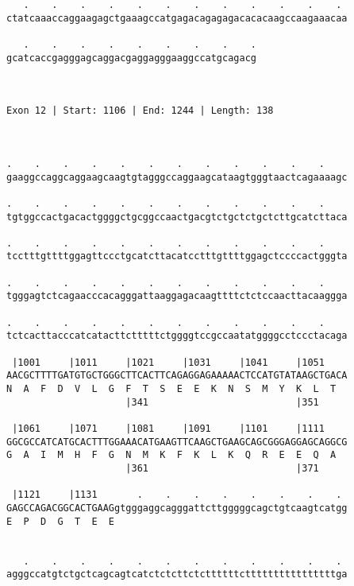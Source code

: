 \documentclass{article}
\begin{document}
\begin{Verbatim}
   .    .    .    .    .    .    .    .    .    .    .    . 
ctatcaaaccaggaagagctgaaagccatgagacagagagacacacaagccaagaaacaa
                                                            
   .    .    .    .    .    .    .    .    .
gcatcaccgagggagcaggacgaggagggaaggccatgcagacg
                                            
                                            
 
Exon 12 | Start: 1106 | End: 1244 | Length: 138



.    .    .    .    .    .    .    .    .    .    .    .    
gaaggccaggcaggaagcaagtgtagggccaggaagcataagtgggtaactcagaaaagc
                                                            
.    .    .    .    .    .    .    .    .    .    .    .    
tgtggccactgacactggggctgcggccaactgacgtctgctctgctcttgcatcttaca
                                                            
.    .    .    .    .    .    .    .    .    .    .    .    
tcctttgttttggagttccctgcatcttacatcctttgttttggagctccccactgggta
                                                            
.    .    .    .    .    .    .    .    .    .    .    .    
tgggagtctcagaacccacagggattaaggagacaagttttctctccaacttacaaggga
                                                            
.    .    .    .    .    .    .    .    .    .    .    .    
tctcacttacccatcatacttctttttctggggtccgccaatatggggcctccctacaga
                                                            
 |1001     |1011     |1021     |1031     |1041     |1051    
AACGCTTTTGATGTGCTGGGCTTCACTTCAGAGGAGAAAAACTCCATGTATAAGCTGACA
N  A  F  D  V  L  G  F  T  S  E  E  K  N  S  M  Y  K  L  T  
                     |341                          |351     
  
 |1061     |1071     |1081     |1091     |1101     |1111    
GGCGCCATCATGCACTTTGGAAACATGAAGTTCAAGCTGAAGCAGCGGGAGGAGCAGGCG
G  A  I  M  H  F  G  N  M  K  F  K  L  K  Q  R  E  E  Q  A  
                     |361                          |371     
  
 |1121     |1131       .    .    .    .    .    .    .    . 
GAGCCAGACGGCACTGAAGgtgggaggcagggattcttgggggcagctgtcaagtcatgg
E  P  D  G  T  E  E                                         
                                                            
  
   .    .    .    .    .    .    .    .    .    .    .    . 
agggccatgtctgctcagcagtcatctctcttctcttttttcttttttttttttttttga
                                                            

\end{Verbatim}
\end{document}

